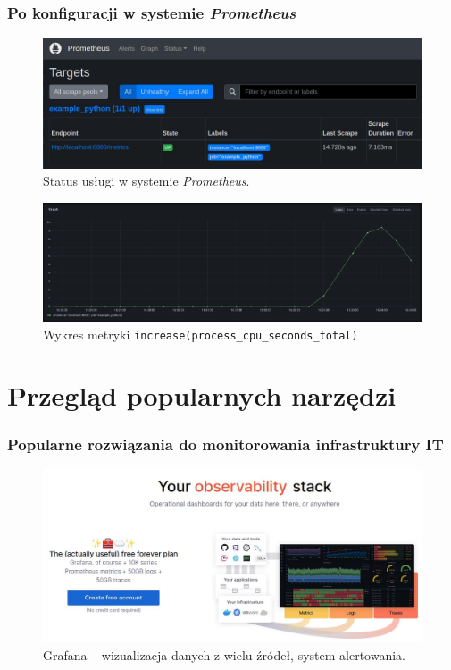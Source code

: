 \documentclass[]{beamer}
\begin{document}
\begin{frame}
  \frametitle{Po konfiguracji w systemie \textit{Prometheus}}

  \begin{figure}
    \centering
    \includegraphics[width=0.7\linewidth]{prometheus_scrape_example.jpg}
    \caption{Status usługi w systemie \textit{Prometheus}.}
  \end{figure}

  \vspace{-0.5cm}

  \begin{figure}
    \centering
    \includegraphics[width=0.7\linewidth]{grafana_example_python_monitoring.jpg}
    \caption{Wykres metryki \texttt{increase(process\_cpu\_seconds\_total)}}
  \end{figure}
\end{frame}

\section{Przegląd popularnych narzędzi}

\begin{frame}
  \frametitle{Popularne rozwiązania do monitorowania infrastruktury IT}
  \begin{figure}
    \centering
    \includegraphics[width=0.8\linewidth]{grafana_website.jpg}
    \caption{Grafana -- wizualizacja danych z wielu źródeł, system alertowania.}
  \end{figure}
\end{frame}
\end{document}
